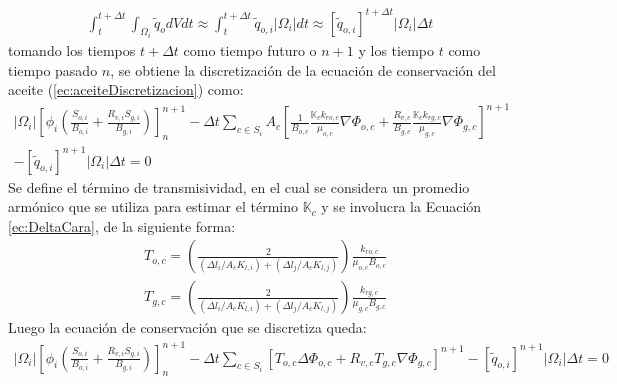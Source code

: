 \begin{appendix}
\begin{align*}
	\int_{t}^{t+\Delta t}\int_{\Omega_{i}}\tilde{q}_{o}dVdt \approx \int_{t}^{t+\Delta t}\tilde{q}_{o,i} |\Omega_{i}|dt
	\approx \left[\tilde{q}_{o,i}\right]^{t+\Delta t} |\Omega_{i}|\Delta t
\end{align*}
tomando los tiempos $t+\Delta t$ como tiempo futuro o $n+1$ y los tiempo $t$ como tiempo pasado $n$, se obtiene la discretización de la ecuación de conservación del aceite (\ref{ec:aceiteDiscretizacion}) como:
\begin{align*}
	|\Omega_{i}|\left[ \phi_{i} \left( \frac{S_{o,i}}{B_{o,i}} + \frac{R_{v,i} S_{g,i}}{B_{g,i}} \right) \right]^{n+1}_{n} - \Delta t \sum_{c \in S_{i}} A_{c} \left[ \frac{1}{B_{o,c}} \frac{\mathbb{K}_{c}k_{ro,c}}{\mu_{o,c}} \nabla \Phi_{o,c} + \frac{R_{v,c}}{B_{g,c}} \frac{\mathbb{K}_{c}k_{rg,c}}{\mu_{g,c}} \nabla \Phi_{g,c} \right]^{n+1} \\- \left[\tilde{q}_{o,i}\right]^{n+1} |\Omega_{i}|\Delta t = 0
\end{align*}
Se define el término de transmisividad, en el cual se considera un promedio armónico que se utiliza para estimar el término $\mathbb{K}_{c}$ y se involucra la Ecuación \ref{ec:DeltaCara}, de la siguiente forma:
\begin{align*}
	&T_{o,c} = \left(\frac{2}{(\Delta l_{i}/A_{c}K_{l,i})+(\Delta l_{j}/A_{c}K_{l,j})}\right)\frac{k_{ro,c}}{\mu_{o,c}B_{o,c}}\\
	&T_{g,c} = \left(\frac{2}{(\Delta l_{i}/A_{c}K_{l,i})+(\Delta l_{j}/A_{c}K_{l,j})}\right)\frac{k_{rg,c}}{\mu_{g,c}B_{g,c}}
\end{align*}
Luego la ecuación de conservación que se discretiza queda:
\begin{align*}
|\Omega_{i}|\left[ \phi_{i} \left( \frac{S_{o,i}}{B_{o,i}} + \frac{R_{v,i} S_{g,i}}{B_{g,i}} \right) \right]^{n+1}_{n} - \Delta t \sum_{c \in S_{i}} \left[ T_{o,c} \Delta \Phi_{o,c} + R_{v,c} T_{g,c} \nabla \Phi_{g,c} \right]^{n+1} - \left[\tilde{q}_{o,i}\right]^{n+1} |\Omega_{i}|\Delta t = 0
\end{align*}


\end{appendix}
